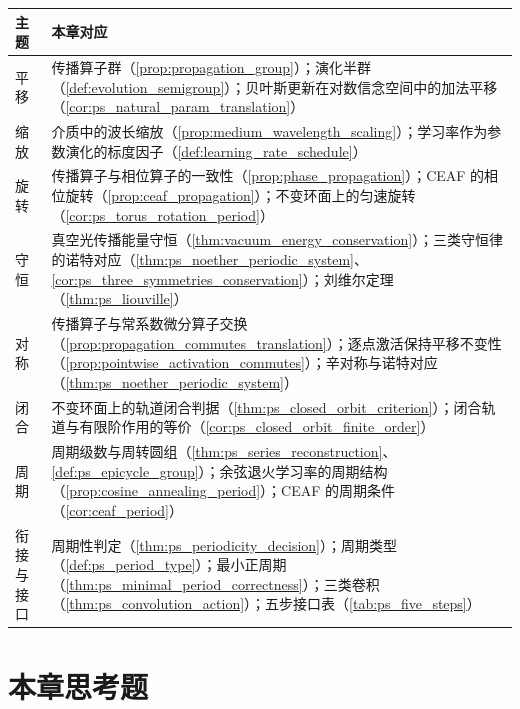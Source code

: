 \begin{center}
\renewcommand{\arraystretch}{1.3}
\begin{tabular}{@{}p{2.2cm} p{10.5cm}@{}}
\toprule
主题 & 本章对应 \\
\midrule
平移 & 传播算子群（\cref{prop:propagation_group}）；演化半群（\cref{def:evolution_semigroup}）；贝叶斯更新在对数信念空间中的加法平移（\cref{cor:ps_natural_param_translation}） \\
缩放 & 介质中的波长缩放（\cref{prop:medium_wavelength_scaling}）；学习率作为参数演化的标度因子（\cref{def:learning_rate_schedule}） \\
旋转 & 传播算子与相位算子的一致性（\cref{prop:phase_propagation}）；CEAF 的相位旋转（\cref{prop:ceaf_propagation}）；不变环面上的匀速旋转（\cref{cor:ps_torus_rotation_period}） \\
守恒 & 真空光传播能量守恒（\cref{thm:vacuum_energy_conservation}）；三类守恒律的诺特对应（\cref{thm:ps_noether_periodic_system}、\cref{cor:ps_three_symmetries_conservation}）；刘维尔定理（\cref{thm:ps_liouville}） \\
对称 & 传播算子与常系数微分算子交换（\cref{prop:propagation_commutes_translation}）；逐点激活保持平移不变性（\cref{prop:pointwise_activation_commutes}）；辛对称与诺特对应（\cref{thm:ps_noether_periodic_system}） \\
闭合 & 不变环面上的轨道闭合判据（\cref{thm:ps_closed_orbit_criterion}）；闭合轨道与有限阶作用的等价（\cref{cor:ps_closed_orbit_finite_order}） \\
周期 & 周期级数与周转圆组（\cref{thm:ps_series_reconstruction}、\cref{def:ps_epicycle_group}）；余弦退火学习率的周期结构（\cref{prop:cosine_annealing_period}）；CEAF 的周期条件（\cref{cor:ceaf_period}） \\
衔接与接口 & 周期性判定（\cref{thm:ps_periodicity_decision}）；周期类型（\cref{def:ps_period_type}）；最小正周期（\cref{thm:ps_minimal_period_correctness}）；三类卷积（\cref{thm:ps_convolution_action}）；五步接口表（\cref{tab:ps_five_steps}） \\
\bottomrule
\end{tabular}
\end{center}

\section*{本章思考题}

